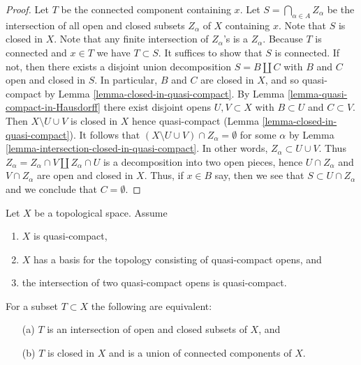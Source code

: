 \begin{proof}
Let $T$ be the connected component containing $x$.
Let $S = \bigcap_{\alpha \in A} Z_\alpha$ be the intersection of all
open and closed subsets $Z_\alpha$ of $X$ containing $x$.
Note that $S$ is closed in $X$.
Note that any finite intersection of $Z_\alpha$'s is a $Z_\alpha$.
Because $T$ is connected and $x \in T$ we have $T \subset S$.
It suffices to show that $S$ is connected.
If not, then there exists a disjoint union decomposition
$S = B \coprod C$ with $B$ and $C$ open and closed in $S$.
In particular, $B$ and $C$ are closed in $X$, and so quasi-compact by
Lemma \ref{lemma-closed-in-quasi-compact}.
By Lemma \ref{lemma-quasi-compact-in-Hausdorff}
there exist disjoint opens $U, V \subset X$ with $B \subset U$ and
$C \subset V$. Then $X \setminus U \cup V$ is closed in $X$
hence quasi-compact (Lemma \ref{lemma-closed-in-quasi-compact}).
It follows that $(X \setminus U \cup V) \cap Z_\alpha = \emptyset$
for some $\alpha$ by Lemma \ref{lemma-intersection-closed-in-quasi-compact}.
In other words, $Z_\alpha \subset U \cup V$. Thus
$Z_\alpha = Z_\alpha \cap V \amalg Z_\alpha \cap U$
is a decomposition into two open pieces,
hence $U \cap Z_\alpha$ and $V \cap Z_\alpha$ are open and closed in $X$.
Thus, if $x \in B$ say, then we see that $S \subset U \cap Z_\alpha$
and we conclude that $C = \emptyset$.
\end{proof}

\begin{lemma}
\label{lemma-closed-union-connected-components}
Let $X$ be a topological space.
Assume
\begin{enumerate}
\item $X$ is quasi-compact,
\item $X$ has a basis for the topology consisting of quasi-compact opens, and
\item the intersection of two quasi-compact opens is quasi-compact.
\end{enumerate}
For a subset $T \subset X$ the following are equivalent:
\begin{enumerate}
\item[(a)] $T$ is an intersection of open and closed subsets of $X$, and
\item[(b)] $T$ is closed in $X$ and is a union of connected components of $X$.
\end{enumerate}
\end{lemma}

